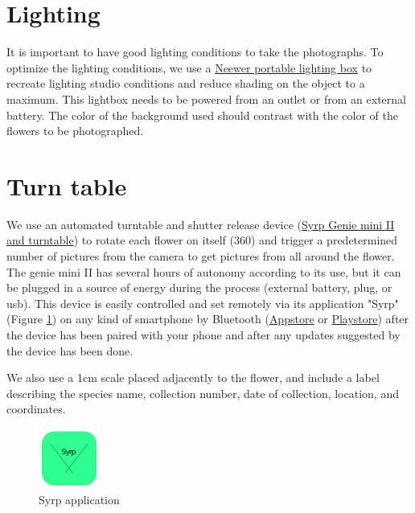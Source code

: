 \documentclass[
]{book}
\begin{document}
\hypertarget{lighting}{%
\section{Lighting}\label{lighting}}

It is important to have good lighting conditions to take the
photographs. To optimize the lighting conditions, we use a \href{https://neewer.com/collections/shooting-tent}{Neewer
portable lighting box} to
recreate lighting studio conditions and reduce shading on the object to
a maximum. This lightbox needs to be powered from an outlet or from an
external battery. The color of the background used should contrast with
the color of the flowers to be photographed.

\hypertarget{turn-table}{%
\section{Turn table}\label{turn-table}}

We use an automated turntable and shutter release device (\href{https://www.bhphotovideo.com/c/product/1486043-REG/syrp_sykit_0043_genie_mini_ii_turntable.html/quick-compare}{Syrp Genie
mini II and
turntable})
to rotate each flower on itself (360) and trigger a predetermined number
of pictures from the camera to get pictures from all around the flower.
The genie mini II has several hours of autonomy according to its use,
but it can be plugged in a source of energy during the process (external
battery, plug, or usb). This device is easily controlled and set
remotely via its application "Syrp" (Figure
\protect\hyperlink{fig:syrp_app}{1}) on
any kind of smartphone by Bluetooth
(\href{https://apps.apple.com/us/app/syrp/id1387335063}{Appstore} or
\href{https://play.google.com/store/apps/details?id=nz.co.syrp.genie2\&hl=fr_CA\&gl=US}{Playstore})
after the device has been paired with your phone and after any updates
suggested by the device has been done.

We also use a 1cm scale placed adjacently to the flower, and include a
label describing the species name, collection number, date of
collection, location, and coordinates.

\begin{figure}
\hypertarget{fig:syrp_app}{%
\centering
\includegraphics[width=2cm,height=\textheight]{Figures/Syrp_app.png}
\caption{Syrp application}\label{fig:syrp_app}
}
\end{figure}
\end{document}
